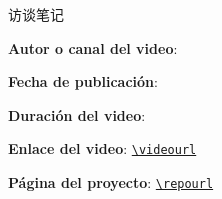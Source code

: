 
\begin{titlepage}
\centering
{\Large 访谈笔记\par}
\vspace{1.2cm}
{\huge\bfseries \notetitle\par}
\vspace{0.8cm}
{\large \noteauthors\par}
\vspace{0.3cm}
{\large \notedate\par}
\vspace{1.2cm}

\rendercover

\vfill
\begin{tcolorbox}[width=0.9\textwidth, colback=black!2!white, colframe=black!60, sharp corners]
\textbf{Autor o canal del video}: \videochannel\par
\textbf{Fecha de publicación}: \videopublishdate\par
\textbf{Duración del video}: \videoduration\par
\textbf{Enlace del video}: \href{\videourl}{\nolinkurl{\videourl}}\par
\textbf{Página del proyecto}: \href{\repourl}{\nolinkurl{\repourl}}\par
\end{tcolorbox}
\end{titlepage}

\tableofcontents
\newpage

